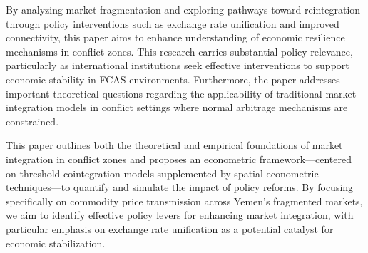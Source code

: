 By analyzing market fragmentation and exploring pathways toward reintegration through policy interventions such as exchange rate unification and improved connectivity, this paper aims to enhance understanding of economic resilience mechanisms in conflict zones. This research carries substantial policy relevance, particularly as international institutions seek effective interventions to support economic stability in FCAS environments. Furthermore, the paper addresses important theoretical questions regarding the applicability of traditional market integration models in conflict settings where normal arbitrage mechanisms are constrained.

This paper outlines both the theoretical and empirical foundations of market integration in conflict zones and proposes an econometric framework—centered on threshold cointegration models supplemented by spatial econometric techniques—to quantify and simulate the impact of policy reforms. By focusing specifically on commodity price transmission across Yemen's fragmented markets, we aim to identify effective policy levers for enhancing market integration, with particular emphasis on exchange rate unification as a potential catalyst for economic stabilization.